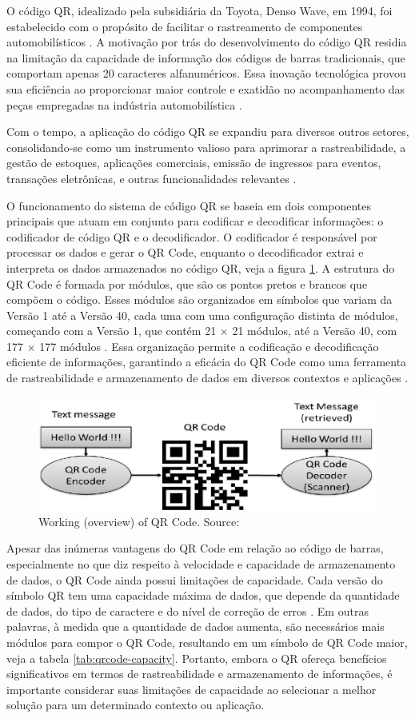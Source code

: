 O código QR, idealizado pela subsidiária da Toyota, Denso Wave, em 1994, foi estabelecido com o propósito de facilitar o rastreamento de componentes automobilísticos . A motivação por trás do desenvolvimento do código QR residia na limitação da capacidade de informação dos códigos de barras tradicionais, que comportam apenas 20 caracteres alfanuméricos. Essa inovação tecnológica provou sua eficiência ao proporcionar maior controle e exatidão no acompanhamento das peças empregadas na indústria automobilística \cite{Tiwari2016}.

Com o tempo, a aplicação do código QR se expandiu para diversos outros setores, consolidando-se como um instrumento valioso para aprimorar a rastreabilidade, a gestão de estoques, aplicações comerciais, emissão de ingressos para eventos, transações eletrônicas, e outras funcionalidades relevantes \cite{Tiwari2016}.

O funcionamento do sistema de código QR se baseia em dois componentes principais que atuam em conjunto para codificar e decodificar informações: o codificador de código QR e o decodificador. O codificador é responsável por processar os dados e gerar o QR Code, enquanto o decodificador extrai e interpreta os dados armazenados no código QR, veja a figura \ref{fig:qr}. A estrutura do QR Code é formada por módulos, que são os pontos pretos e brancos que compõem o código. Esses módulos são organizados em símbolos que variam da Versão 1 até a Versão 40, cada uma com uma configuração distinta de módulos, começando com a Versão 1, que contém 21 × 21 módulos, até a Versão 40, com 177 × 177 módulos \cite{iso_18004_2015}. Essa organização permite a codificação e decodificação eficiente de informações, garantindo a eficácia do QR Code como uma ferramenta de rastreabilidade e armazenamento de dados em diversos contextos e aplicações \cite{Tiwari2016}.


\begin{figure}[h!]
\centering
\includegraphics[width=.65\linewidth]{images/Development/chap3/QR.png}
\caption{Working (overview) of QR Code. Source: \cite{Tiwari2016}}
\label{fig:qr}
\end{figure}
Apesar das inúmeras vantagens do QR Code em relação ao código de barras, especialmente no que diz respeito à velocidade e capacidade de armazenamento de dados, o QR Code ainda possui limitações de capacidade. Cada versão do símbolo QR tem uma capacidade máxima de dados, que depende da quantidade de dados, do tipo de caractere e do nível de correção de erros \cite{Tiwari2016}. Em outras palavras, à medida que a quantidade de dados aumenta, são necessários mais módulos para compor o QR Code, resultando em um símbolo de QR Code maior, veja a tabela \ref{tab:qrcode-capacity}. Portanto, embora o QR ofereça benefícios significativos em termos de rastreabilidade e armazenamento de informações, é importante considerar suas limitações de capacidade ao selecionar a melhor solução para um determinado contexto ou aplicação.

